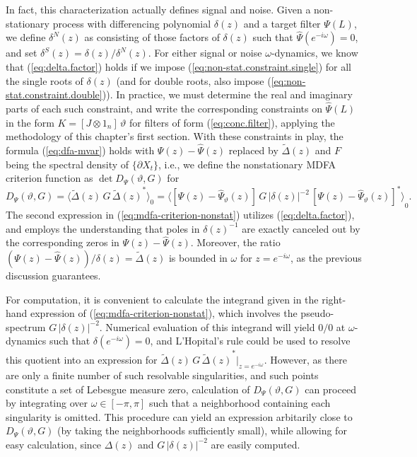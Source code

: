 \documentclass[a4paper]{book}
\begin{document}
  In fact, this characterization actually
  defines signal and noise.   Given a non-stationary process with differencing
  polynomial $\delta (z)$ and a target filter $\Psi (L)$, we define $\delta^N (z)$
  as consisting of those factors of $\delta (z)$ such that
   $ \widehat{\Psi} (e^{-i \omega}) = 0$, and set $\delta^S (z) = \delta (z)/ \delta^N (z)$.
  For either signal or noise $\omega$-dynamics, we know that 
  (\ref{eq:delta.factor}) holds if we impose  (\ref{eq:non-stat.constraint.single}) for all
   the single roots of $\delta (z)$
   (and for double roots, also impose  (\ref{eq:non-stat.constraint.double})).
 In practice, we must determine the real and imaginary  parts of each such 
 constraint, and write the corresponding constraints on $\widehat{\Psi} (L)$ 
 in the form $K = [J \otimes 1_n] \, \vartheta$ for
  filters of form (\ref{eq:conc.filter}), applying the methodology 
  of this chapter's first section.  With these constraints in play, 
   the formula (\ref{eq:dfa-mvar}) holds with $\Psi (z) - \widehat{\Psi} (z)$
   replaced by $\widetilde{\Delta} (z)$
 and $F$ being the spectral density of $\{ \partial X_t \}$, i.e., 
 we define the nonstationary MDFA criterion
 function as $\det D_{\Psi } (\vartheta, G)$ for
\begin{equation}
\label{eq:mdfa-criterion-nonstat}
 D_{\Psi} (\vartheta, G) =     { \langle  \widetilde{\Delta} (z)   \, 
 G \,  {\widetilde{\Delta} (z) }^*   \rangle }_0
 = { \langle  \left[ \Psi (z) -   \widehat{\Psi}_{\vartheta} (z) \right] \, 
 G \, {|\delta (z) |}^{-2} \,
  {  \left[ \Psi (z) -  \widehat{\Psi}_{\vartheta} (z) \right] }^{*} \rangle }_0.
\end{equation}
  The second expression in (\ref{eq:mdfa-criterion-nonstat}) 
  utilizes (\ref{eq:delta.factor}), and employs the understanding
 that poles in ${\delta (z) }^{-1}$ are exactly canceled out by the 
 corresponding zeros in $\Psi (z) - \widehat{\Psi} (z)$.
  Moreover, the ratio $(\Psi (z) - \widehat{\Psi} (z))/\delta (z) = 
  \widetilde{\Delta} (z)$ is bounded in $\omega$ for $z = e^{-i \omega}$,
 as the previous discussion guarantees. 
 
 For computation, it is convenient to calculate the integrand given in the
  right-hand expression of (\ref{eq:mdfa-criterion-nonstat}), which involves
   the pseudo-spectrum $ G \, {|\delta (z) |}^{-2}$.  Numerical
    evaluation of this integrand will yield $0/0$ at $\omega$-dynamics such
  that $\delta (e^{-i \omega}) = 0$, and L'Hopital's rule could be used
  to resolve this quotient into an expression for
  $\widetilde{\Delta} (z)   \,  G \,  {\widetilde{\Delta} (z) }^* \vert_{z= e^{-i \omega}}$.
  However, as there are only a finite number of such resolvable singularities,
   and such points constitute a set of   Lebesgue measure zero, 
   calculation of $D_{\Psi} (\vartheta, G)$ can proceed by 
   integrating over $\omega \in [-\pi, \pi]$ such that a neighborhood containing
    each singularity is omitted.  This procedure can yield an expression arbitarily
     close to $D_{\Psi} (\vartheta, G)$ (by taking the neighborhoods sufficiently small),
    while allowing for easy calculation, since $\Delta (z)$ and 
    $ G \, {|\delta (z) |}^{-2}$ are easily computed.  
   
\end{document}
